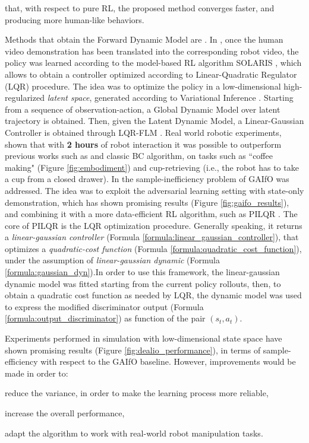 that, with respect to pure RL, the proposed method converges faster, and producing more human-like behaviors.

\newline Methods that obtain the Forward Dynamic Model are \cite{smith2019avid,torabi2021dealio}. In \cite{smith2019avid}, once the human video demonstration has been translated into the corresponding robot video, the policy was learned according to the model-based RL algorithm SOLARIS \cite{zhang2019solar}, which allows to obtain a controller optimized according to Linear-Quadratic Regulator (LQR) procedure. The idea was to optimize the policy in a low-dimensional high-regularized \textit{latent space}, generated according to Variational Inference \cite{Kingma2014_vae}. Starting from a sequence of observation-action, a Global Dynamic Model over latent trajectory is obtained. Then, given the Latent Dynamic Model, a Linear-Gaussian Controller is obtained through LQR-FLM \cite{levine2014lqr_flm}. Real world robotic experiments, shown that with \textbf{2 hours} of robot interaction it was possible to outperform previous works such as \cite{sermanet2018time_contrastive,torabi2018bco} and classic BC algorithm, on tasks such as ``coffee making" (Figure \ref{fig:embodiment}) and cup-retrieving (i.e., the robot has to take a cup from a closed drawer).
In \cite{torabi2021dealio} the sample-inefficiency problem of GAIfO \cite{torabi2018gaifo} was addressed. The idea was to exploit the adversarial learning setting with state-only demonstration, which has shown promising results (Figure \ref{fig:gaifo_results}), and combining it with a more data-efficient RL algorithm, such as PILQR \cite{chebotar2017pilqr}. The core of PILQR is the LQR optimization procedure. Generally speaking, it returns a \textit{linear-gaussian controller} (Formula \ref{formula:linear_gaussian_controller}), that optimizes a \textit{quadratic-cost function} (Formula \ref{formula:quadratic_cost_function}), under the assumption of \textit{linear-gaussian dynamic} (Formula \ref{formula:gaussian_dyn}).\noindent In order to use this framework, the linear-gaussian dynamic model was fitted starting from the current policy rollouts, then, to obtain a quadratic cost function as needed by LQR, the dynamic model was used to express the modified discriminator output (Formula \ref{formula:output_discriminator}) as function of the pair $(s_{t},a_{t})$.

Experiments performed in simulation with low-dimensional state space have shown promising results (Figure \ref{fig:dealio_performance}), in terms of sample-efficiency with respect to the GAIfO baseline. However, improvements would be made in order to: \begin{enumerate*}[label=\textbf{(\arabic*)}]
    \item reduce the variance, in order to make the learning process more reliable,
    \item increase the overall performance,
    \item adapt the algorithm to work with real-world robot manipulation tasks.
\end{enumerate*}


